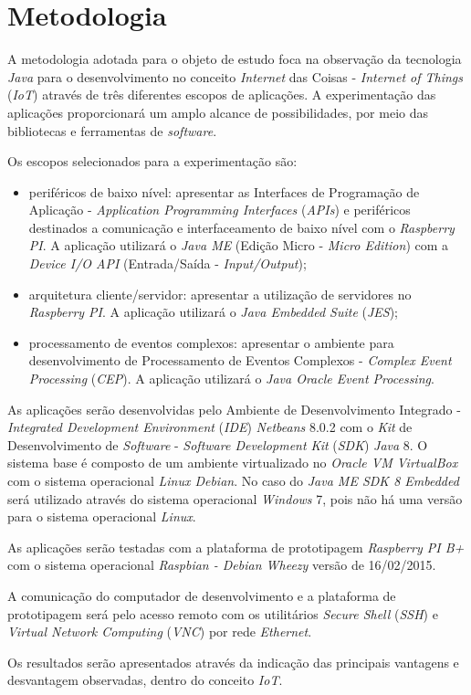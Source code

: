 %

\chapter{Metodologia}

A metodologia adotada para o objeto de estudo foca na observação da tecnologia 
\textit{Java} para o desenvolvimento no conceito \textit{Internet} das Coisas - \textit{Internet of Things} (\textit{IoT})
através de três diferentes escopos de aplicações. A experimentação das 
aplicações proporcionará um amplo alcance de possibilidades, por meio das 
bibliotecas e ferramentas de \textit{software}.

Os escopos selecionados para a experimentação são:

\begin{itemize}
    
	\item periféricos de baixo nível: apresentar as Interfaces de Programação 
	de Aplicação - \textit{Application Programming Interfaces} (\textit{APIs}) 
	e periféricos destinados a comunicação e interfaceamento de baixo nível com 
	o \textit{Raspberry PI}. A aplicação utilizará o \textit{Java ME} (Edição 
	Micro - \textit{Micro Edition}) com a \textit{Device I/O API} 
	(Entrada/Saída - \textit{Input/Output});
    
	\item arquitetura cliente/servidor: apresentar a utilização de servidores 
	no \textit{Raspberry PI}. A aplicação utilizará o \textit{Java Embedded 
	Suite} (\textit{JES});
    
	\item processamento de eventos complexos: apresentar o ambiente para 
	desenvolvimento de Processamento de Eventos Complexos - \textit{Complex Event Processing} (\textit{CEP}).
	A aplicação utilizará o \textit{Java Oracle Event Processing}.
    
\end{itemize}

As aplicações serão desenvolvidas pelo Ambiente de Desenvolvimento Integrado -  
\textit{Integrated Development Environment} (\textit{IDE}) \textit{Netbeans} 
8.0.2 com o \textit{Kit} de Desenvolvimento de \textit{Software} - 
\textit{Software Development Kit} (\textit{SDK}) \textit{Java} 8. O sistema 
base é composto de um ambiente virtualizado no \textit{Oracle VM VirtualBox} 
com o sistema operacional \textit{Linux Debian}. No caso do \textit{Java ME SDK 
8 Embedded} será utilizado através do sistema operacional \textit{Windows} 7, 
pois não há uma versão para o sistema operacional \textit{Linux}.

As aplicações serão testadas com a plataforma de prototipagem \textit{Raspberry 
PI B+} com o sistema operacional \textit{Raspbian - Debian Wheezy} versão de 
16/02/2015.

A comunicação do computador de desenvolvimento e a plataforma de prototipagem 
será pelo acesso remoto com os utilitários \textit{Secure Shell} (\textit{SSH}) 
e \textit{Virtual Network Computing} (\textit{VNC}) por rede \textit{Ethernet}.

Os resultados serão apresentados através da indicação das principais vantagens 
e desvantagem observadas, dentro do conceito \textit{IoT}.
